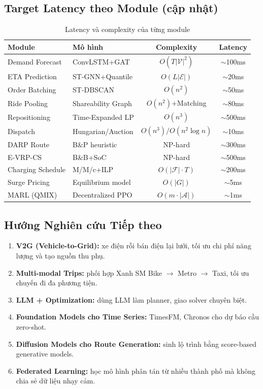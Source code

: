\documentclass[12pt,a4paper]{article}
\begin{document}
\subsection{Target Latency theo Module (cập nhật)}

\begin{table}[h!]
\centering
\caption{Latency và complexity của từng module}
\renewcommand{\arraystretch}{1.25}
\begin{tabular}{llcc}
\toprule
\textbf{Module} & \textbf{Mô hình} & \textbf{Complexity} & \textbf{Latency} \\
\midrule
Demand Forecast & ConvLSTM+GAT & $O(T|\mathcal{V}|^2)$ & $\sim$100ms \\
ETA Prediction & ST-GNN+Quantile & $O(L|\mathcal{E}|)$ & $\sim$20ms \\
Order Batching & ST-DBSCAN & $O(n^2)$ & $\sim$50ms \\
Ride Pooling & Shareability Graph & $O(n^2)$+Matching & $\sim$80ms \\
Repositioning & Time-Expanded LP & $O(n^3)$ & $\sim$500ms \\
Dispatch & Hungarian/Auction & $O(n^3)/O(n^2\log n)$ & $\sim$10ms \\
DARP Route & B\&P heuristic & NP-hard & $\sim$300ms \\
E-VRP-CS & B\&B+SoC & NP-hard & $\sim$500ms \\
Charging Schedule & M/M/c+ILP & $O(|\mathcal{F}|\cdot T)$ & $\sim$200ms \\
Surge Pricing & Equilibrium model & $O(|G|)$ & $\sim$5ms \\
MARL (QMIX) & Decentralized PPO & $O(m\cdot|\mathcal{A}|)$ & $\sim$1ms \\
\bottomrule
\end{tabular}
\end{table}

\subsection{Hướng Nghiên cứu Tiếp theo}

\begin{enumerate}[leftmargin=2em, itemsep=4pt]
  \item \textbf{V2G (Vehicle-to-Grid):} xe điện rỗi bán điện lại lưới,
        tối ưu chi phí năng lượng và tạo nguồn thu phụ.
  \item \textbf{Multi-modal Trips:} phối hợp Xanh SM Bike $\to$ Metro $\to$ Taxi,
        tối ưu chuyến đi đa phương tiện.
  \item \textbf{LLM + Optimization:} dùng LLM làm planner, giao solver chuyên biệt.
  \item \textbf{Foundation Models cho Time Series:} TimesFM, Chronos
        cho dự báo cầu zero-shot.
  \item \textbf{Diffusion Models cho Route Generation:}
        sinh lộ trình bằng score-based generative models.
  \item \textbf{Federated Learning:} học mô hình phân tán từ nhiều thành phố
        mà không chia sẻ dữ liệu nhạy cảm.
\end{enumerate}
\end{document}
